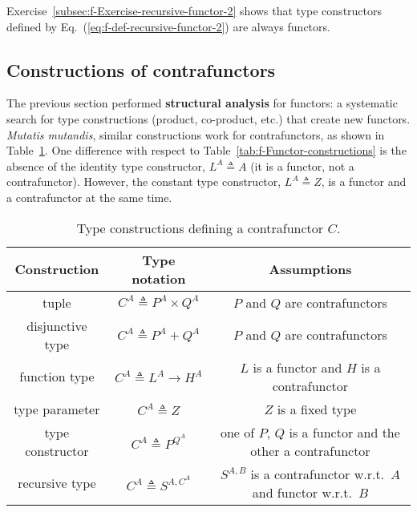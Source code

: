 Exercise~\ref{subsec:f-Exercise-recursive-functor-2} shows that
type constructors defined by Eq.~(\ref{eq:f-def-recursive-functor-2})
are always functors.

\subsection{Constructions of contrafunctors\label{subsec:f-Contrafunctor-constructions}}

The previous section performed \textbf{structural analysis}
for functors: a systematic search for type constructions (product,
co-product, etc.) that create new functors.\emph{ Mutatis mutandis},
similar constructions work for contrafunctors, as shown in Table~\ref{tab:f-Contrafunctor-constructions}.
One difference with respect to Table~\ref{tab:f-Functor-constructions}
is the absence of the identity type constructor, $L^{A}\triangleq A$
(it is a functor, not a contrafunctor). However, the constant type
constructor, $L^{A}\triangleq Z$, is a functor and a contrafunctor
at the same time.

\begin{table}
\begin{centering}
\begin{tabular}{|c|c|c|}
\hline 
\textbf{\small{}Construction} & \textbf{\small{}Type notation} & \textbf{\small{}Assumptions}\tabularnewline
\hline 
\hline 
{\footnotesize{}tuple} & {\footnotesize{}$C^{A}\triangleq P^{A}\times Q^{A}$} & {\footnotesize{}$P$ and $Q$ are contrafunctors}\tabularnewline
\hline 
{\footnotesize{}disjunctive type} & {\footnotesize{}$C^{A}\triangleq P^{A}+Q^{A}$} & {\footnotesize{}$P$ and $Q$ are contrafunctors}\tabularnewline
\hline 
{\footnotesize{}function type} & {\footnotesize{}$C^{A}\triangleq L^{A}\rightarrow H^{A}$} & {\footnotesize{}$L$ is a functor and $H$ is a contrafunctor}\tabularnewline
\hline 
{\footnotesize{}type parameter} & {\footnotesize{}$C^{A}\triangleq Z$} & {\footnotesize{}$Z$ is a fixed type}\tabularnewline
\hline 
{\footnotesize{}type constructor} & {\footnotesize{}$C^{A}\triangleq P^{Q^{A}}$} & {\footnotesize{}one of $P$, $Q$ is a functor and the other a contrafunctor}\tabularnewline
\hline 
{\footnotesize{}recursive type} & {\footnotesize{}$C^{A}\triangleq S^{A,C^{A}}$} & {\footnotesize{}$S^{A,B}$ is a contrafunctor w.r.t.~$A$ and functor
w.r.t.~$B$}\tabularnewline
\hline 
\end{tabular}
\par\end{centering}
\caption{Type constructions defining a contrafunctor $C$.\label{tab:f-Contrafunctor-constructions}}
\end{table}


